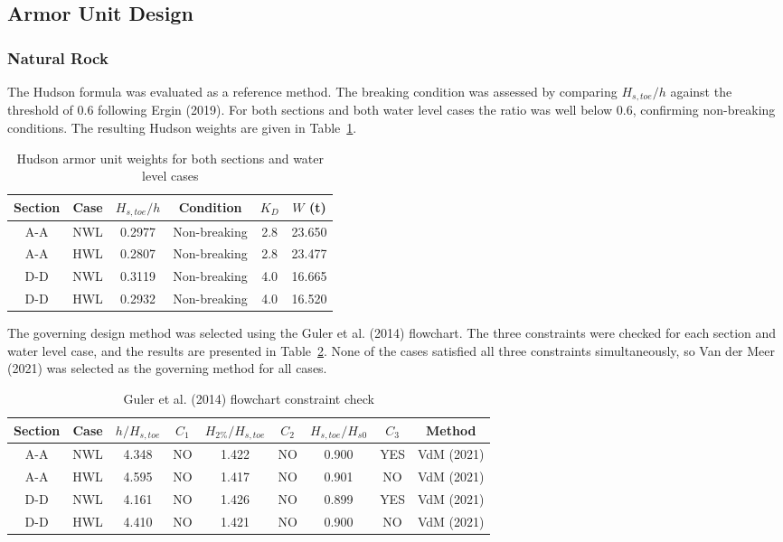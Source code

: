 \documentclass[a4paper, 11pt]{article}
\begin{document}
\subsection{Armor Unit Design}
\subsubsection{Natural Rock}
\hspace{0.5cm} The Hudson formula was evaluated as a reference method. The breaking condition was assessed by comparing $H_{s,toe}/h$ against the threshold of 0.6 following Ergin (2019). For both sections and both water level cases the ratio was well below 0.6, confirming non-breaking conditions. The resulting Hudson weights are given in Table~\ref{tab:hudson}.

\begin{table}[H]
\centering
\caption{Hudson armor unit weights for both sections and water level cases}
\label{tab:hudson}
\begin{tabular}{cccccc}
\hline
Section & Case & $H_{s,toe}/h$ & Condition & $K_{D}$ & $W$ (t) \\
\hline
A-A & NWL & 0.2977 & Non-breaking & 2.8 & 23.650 \\
A-A & HWL & 0.2807 & Non-breaking & 2.8 & 23.477 \\
D-D & NWL & 0.3119 & Non-breaking & 4.0 & 16.665 \\
D-D & HWL & 0.2932 & Non-breaking & 4.0 & 16.520 \\
\hline
\end{tabular}
\end{table}

\hspace{0.5cm} The governing design method was selected using the Guler et al. (2014) flowchart. The three constraints were checked for each section and water level case, and the results are presented in Table~\ref{tab:flowchart}. None of the cases satisfied all three constraints simultaneously, so Van der Meer (2021) was selected as the governing method for all cases.

\begin{table}[H]
\centering
\caption{Guler et al. (2014) flowchart constraint check}
\label{tab:flowchart}
\begin{tabular}{ccccccccc}
\hline
Section & Case & $h/H_{s,toe}$ & $C_{1}$ & $H_{2\%}/H_{s,toe}$ & $C_{2}$ & $H_{s,toe}/H_{s0}$ & $C_{3}$ & Method \\
\hline
A-A & NWL & 4.348 & NO & 1.422 & NO & 0.900 & YES & VdM (2021) \\
A-A & HWL & 4.595 & NO & 1.417 & NO & 0.901 & NO  & VdM (2021) \\
D-D & NWL & 4.161 & NO & 1.426 & NO & 0.899 & YES & VdM (2021) \\
D-D & HWL & 4.410 & NO & 1.421 & NO & 0.900 & NO  & VdM (2021) \\
\hline
\end{tabular}
\end{table}
\end{document}
